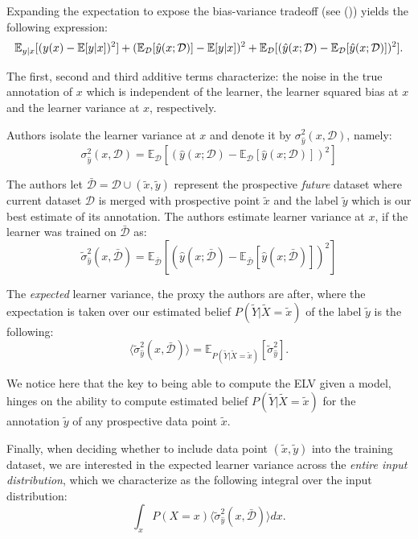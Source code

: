 \documentclass[
  letterpaper,
  DIV=11,
  numbers=noendperiod,
  oneside]{scrreprt}
\theoremstyle{remark}
\begin{document}
Expanding the expectation to expose the bias-variance tradeoff (see
()) yields the following expression:
\[\mathbb{E}_{y|x}[(y(x) - \mathbb{E}[y|x])^2] \\ + (\mathbb{E}_{\mathcal{D}}[\hat{y}(x; \mathcal{D})] - \mathbb{E}[y|x])^2 \\+ \mathbb{E}_{\mathcal{D}}[(\hat{y}(x; \mathcal{D}) - \mathbb{E}_{\mathcal{D}}[\hat{y}(x; \mathcal{D})])^2].\]

The first, second and third additive terms characterize: the noise in
the true annotation of \(x\) which is independent of the learner, the
learner squared bias at \(x\) and the learner variance at \(x\),
respectively.

Authors isolate the learner variance at \(x\) and denote it by
\(\sigma_{\hat{y}}^2(x, \mathcal{D})\), namely:
\[\sigma_{\hat{y}}^2(x, \mathcal{D}) = \mathbb{E}_{\mathcal{D}}[(\hat{y}(x; \mathcal{D}) - \mathbb{E}_{\mathcal{D}}[\hat{y}(x; \mathcal{D})])^2]\]

The authors let
\(\bar{\mathcal{D}} = \mathcal{D} \cup (\tilde{x}, \tilde{y})\)
represent the prospective \emph{future} dataset where current dataset
\(\mathcal{D}\) is merged with prospective point \(\tilde{x}\) and the
label \(\tilde{y}\) which is our best estimate of its annotation. The
authors estimate learner variance at \(x\), if the learner was trained
on \(\bar{\mathcal{D}}\) as:
\[\tilde{\sigma}_{\hat{y}}^2(x, \mathcal{\bar{D}})= \mathbb{E}_{\bar{\mathcal{D}}}[(\hat{y}(x; \bar{\mathcal{D}}) - \mathbb{E}_{\bar{\mathcal{D}}}[\hat{y}(x; \bar{\mathcal{D}})])^2]\]

The \emph{expected} learner variance, the proxy the authors are after,
where the expectation is taken over our estimated belief
\(P(\tilde{Y}|\tilde{X}=\tilde{x})\) of the label \(\tilde{y}\) is the
following: \[\label{eqn:ELV_at_x}
  \langle\tilde{\sigma}_{\hat{y}}^2(x, \mathcal{\bar{D}})\rangle= \mathbb{E}_{P(\tilde{Y} | \tilde{X}=\tilde{x})}[\tilde{\sigma}_{\hat{y}}^2]. \tag{1}\]

We notice here that the key to being able to compute the ELV given a
model, hinges on the ability to compute estimated belief
\(P(\tilde{Y}|\tilde{X}=\tilde{x})\) for the annotation \(\tilde{y}\) of
any prospective data point \(\tilde{x}\).

Finally, when deciding whether to include data point
\((\tilde{x}, \tilde{y})\) into the training dataset, we are interested
in the expected learner variance across the \emph{entire input
distribution}, which we characterize as the following integral over the
input distribution:
\[\int_x P(X=x) \langle\tilde{\sigma}_{\hat{y}}^2(x, \mathcal{\bar{D}})\rangle dx.\]
\end{document}
